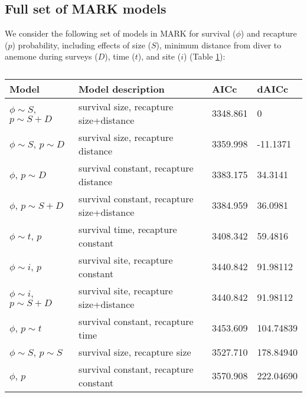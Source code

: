\documentclass[12pt, oneside]{article}   	%
\begin{document}
\newpage{}

\subsection{Full set of MARK models} \label{APP_MARKModels}
We consider the following set of models in MARK for survival ($\phi$) and recapture ($p$) probability, including effects of size ($S$), minimum distance from diver to anemone during surveys ($D$), time ($t$), and site ($i$) (Table \ref{APP_TAB_MARKmodels}):

\begin{table}
\begin{centering}
\begin{tabular}{|p{2in}|p{2.5in}|p{0.75in}|p{0.75in}|}
\hline 
\textbf{Model} & \textbf{Model description} & \textbf{AICc} & \textbf{dAICc} \\ \hline
$\phi \sim S$, $p \sim S+D$ & survival size, recapture size+distance & 3348.861 & 0 \\ \hline
$\phi \sim S$, $p \sim D$ & survival size, recapture distance & 3359.998 & -11.1371 \\ \hline
$\phi$, $p \sim D$ & survival constant, recapture distance & 3383.175 & 34.3141 \\ \hline
$\phi$, $p \sim S+D$ & survival constant, recapture size+distance & 3384.959 & 36.0981 \\ \hline
$\phi \sim t$, $p$ & survival time, recapture constant & 3408.342 & 59.4816 \\ \hline
$\phi \sim i$, $p$ & survival site, recapture constant & 3440.842 & 91.98112 \\ \hline
$\phi \sim i$, $p \sim S+D$ & survival site, recapture size+distance & 3440.842 & 91.98112 \\ \hline
$\phi$, $p \sim t$ & survival constant, recapture time & 3453.609 & 104.74839 \\ \hline
$\phi \sim S$, $p \sim S$ & survival size, recapture size & 3527.710 & 178.84940 \\ \hline
$\phi$, $p$ & survival constant, recapture constant & 3570.908 & 222.04690 \\ \hline
\end{tabular}
\end{centering}
\caption{}\label{APP_TAB_MARKmodels}
\end{table}
\end{document}
